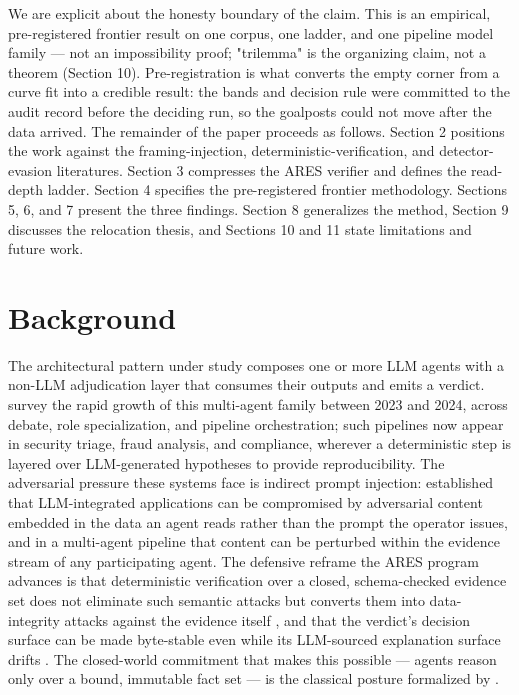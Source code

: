 \documentclass[sigconf,anonymous,review]{acmart}
\begin{document}
We are explicit about the honesty boundary of the claim. This is an empirical, pre-registered frontier result on one corpus, one ladder, and one pipeline model family --- not an impossibility proof; "trilemma" is the organizing claim, not a theorem (Section 10). Pre-registration is what converts the empty corner from a curve fit into a credible result: the bands and decision rule were committed to the audit record before the deciding run, so the goalposts could not move after the data arrived. The remainder of the paper proceeds as follows. Section 2 positions the work against the framing-injection, deterministic-verification, and detector-evasion literatures. Section 3 compresses the ARES verifier and defines the read-depth ladder. Section 4 specifies the pre-registered frontier methodology. Sections 5, 6, and 7 present the three findings. Section 8 generalizes the method, Section 9 discusses the relocation thesis, and Sections 10 and 11 state limitations and future work.


\section{Background}
The architectural pattern under study composes one or more LLM agents with a non-LLM adjudication layer that consumes their outputs and emits a verdict. \citet{guo-2024} survey the rapid growth of this multi-agent family between 2023 and 2024, across debate, role specialization, and pipeline orchestration; such pipelines now appear in security triage, fraud analysis, and compliance, wherever a deterministic step is layered over LLM-generated hypotheses to provide reproducibility. The adversarial pressure these systems face is indirect prompt injection: \citet{greshake-2023} established that LLM-integrated applications can be compromised by adversarial content embedded in the data an agent reads rather than the prompt the operator issues, and in a multi-agent pipeline that content can be perturbed within the evidence stream of any participating agent. The defensive reframe the ARES program advances is that deterministic verification over a closed, schema-checked evidence set does not eliminate such semantic attacks but converts them into data-integrity attacks against the evidence itself \citep{gmys-casiano-2026b}, and that the verdict's decision surface can be made byte-stable even while its LLM-sourced explanation surface drifts \citep{gmys-casiano-2026c}. The closed-world commitment that makes this possible --- agents reason only over a bound, immutable fact set --- is the classical posture formalized by \citet{reiter-1978}.
\end{document}

